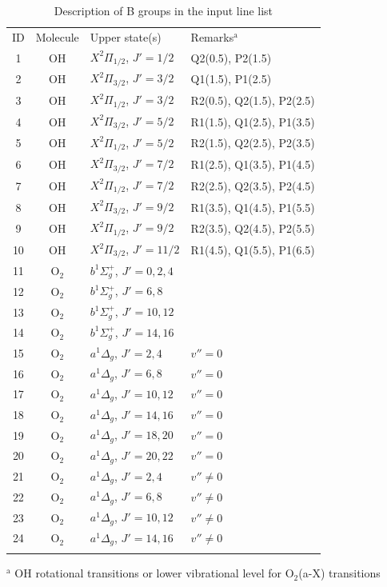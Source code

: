 \begin{table}
\caption[]{Description of B groups in the input line list}
\label{tab:Bgroups}
\centering
\footnotesize
\vspace{5pt}
\begin{tabular}{c c l l}
\hline\hline
\noalign{\smallskip}
ID & Molecule & Upper state(s) & Remarks$^\mathrm{a}$ \\
\noalign{\smallskip}
\hline
\noalign{\smallskip}
 1 & OH & $X^2\Pi_{1/2}$, $J' = 1/2$  & Q2(0.5), P2(1.5) \\
 2 & OH & $X^2\Pi_{3/2}$, $J' = 3/2$  & Q1(1.5), P1(2.5) \\
 3 & OH & $X^2\Pi_{1/2}$, $J' = 3/2$  & R2(0.5), Q2(1.5), P2(2.5) \\
 4 & OH & $X^2\Pi_{3/2}$, $J' = 5/2$  & R1(1.5), Q1(2.5), P1(3.5) \\
 5 & OH & $X^2\Pi_{1/2}$, $J' = 5/2$  & R2(1.5), Q2(2.5), P2(3.5) \\
 6 & OH & $X^2\Pi_{3/2}$, $J' = 7/2$  & R1(2.5), Q1(3.5), P1(4.5) \\
 7 & OH & $X^2\Pi_{1/2}$, $J' = 7/2$  & R2(2.5), Q2(3.5), P2(4.5) \\
 8 & OH & $X^2\Pi_{3/2}$, $J' = 9/2$  & R1(3.5), Q1(4.5), P1(5.5) \\
 9 & OH & $X^2\Pi_{1/2}$, $J' = 9/2$  & R2(3.5), Q2(4.5), P2(5.5) \\
10 & OH & $X^2\Pi_{3/2}$, $J' = 11/2$ & R1(4.5), Q1(5.5), P1(6.5) \\
11 & O$_2$ & $b^1\Sigma^+_g$, $J' = 0, 2, 4$ & \\
12 & O$_2$ & $b^1\Sigma^+_g$, $J' = 6, 8$ & \\
13 & O$_2$ & $b^1\Sigma^+_g$, $J' = 10, 12$ & \\
14 & O$_2$ & $b^1\Sigma^+_g$, $J' = 14, 16$ & \\
15 & O$_2$ & $a^1\Delta_g$, $J' = 2, 4$ & $v'' = 0$ \\
16 & O$_2$ & $a^1\Delta_g$, $J' = 6, 8$ & $v'' = 0$ \\
17 & O$_2$ & $a^1\Delta_g$, $J' = 10, 12$ & $v'' = 0$ \\
18 & O$_2$ & $a^1\Delta_g$, $J' = 14, 16$ & $v'' = 0$ \\
19 & O$_2$ & $a^1\Delta_g$, $J' = 18, 20$ & $v'' = 0$ \\
20 & O$_2$ & $a^1\Delta_g$, $J' = 20, 22$ & $v'' = 0$ \\
21 & O$_2$ & $a^1\Delta_g$, $J' = 2, 4$ & $v'' \ne 0$ \\
22 & O$_2$ & $a^1\Delta_g$, $J' = 6, 8$ & $v'' \ne 0$ \\
23 & O$_2$ & $a^1\Delta_g$, $J' = 10, 12$ & $v'' \ne 0$ \\
24 & O$_2$ & $a^1\Delta_g$, $J' = 14, 16$ & $v'' \ne 0$ \\
\noalign{\smallskip}
\hline
\end{tabular}
\footnotesize
\begin{list}{}{}
\item[$^\mathrm{a}$] OH rotational transitions or lower vibrational level for
O$_2$(a-X) transitions
\end{list}
\end{table}

